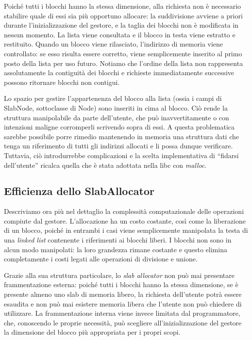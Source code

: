 Poiché tutti i blocchi hanno la stessa dimensione, alla richiesta non è necessario stabilire quale di essi sia più opportuno allocare: la suddivisione avviene a priori durante l’inizializzazione del gestore, e la taglia dei blocchi non è modificata in nessun momento. La lista viene consultata e il blocco in testa viene estratto e restituito. Quando un blocco viene rilasciato, l’indirizzo di memoria viene controllato: se esso risulta essere corretto, viene semplicemente inserito al primo posto della lista per uso futuro. Notiamo che l’ordine della lista non rappresenta assolutamente la contiguità dei blocchi e richieste immediatamente successive possono ritornare blocchi non contigui.

Lo spazio per gestire l’appartenenza del blocco alla lista (ossia i campi di SlabNode, sottoclasse di Node) sono inseriti in cima al blocco. Ciò rende la struttura manipolabile da parte dell’utente, che può inavvertitamente o con intenzioni maligne corromperli scrivendo sopra di essi. A questa problematica sarebbe possibile porre rimedio mantenendo in memoria una struttura dati che tenga un riferimento di tutti gli indirizzi allocati e li possa dunque verificare. Tuttavia, ciò introdurrebbe complicazioni e la scelta implementativa di “fidarsi dell’utente” ricalca quella che è stata adottata nella libc con \textit{malloc}.

\subsection*{Efficienza dello SlabAllocator}
Descriviamo ora più nel dettaglio la complessità computazionale delle operazioni compiute dal gestore. L’allocazione ha un costo costante, così come la liberazione di un blocco, poiché in entrambi i casi viene semplicemente manipolata la testa di una \textit{linked list} contenente i riferimenti ai blocchi liberi. I blocchi non sono in alcun modo manipolati: la loro grandezza rimane costante e questo elimina completamente i costi legati alle operazioni di divisione e unione.

Grazie alla sua struttura particolare, lo \textit{slab allocator} non può mai presentare frammentazione esterna: poiché tutti i blocchi hanno la stessa dimensione, se è presente almeno uno slab di memoria libero, la richiesta dell’utente potrà essere esaudita e non può mai esistere memoria libera che l’utente non può chiedere di utilizzare. La frammentazione interna viene invece limitata dal programmatore, che, conoscendo le proprie necessità, può scegliere all’inizializzazione del gestore la dimensione del blocco più appropriata per i propri scopi.

